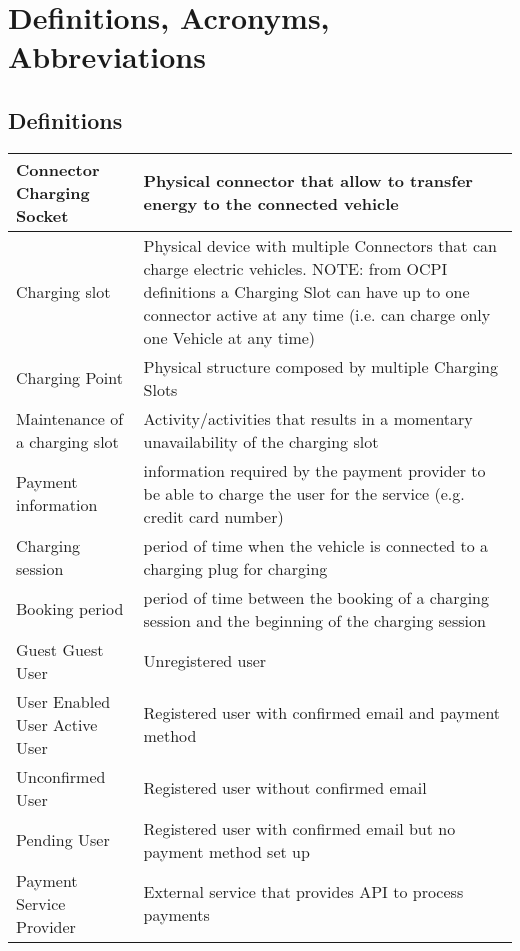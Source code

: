 \section{Definitions, Acronyms, Abbreviations}

\subsection{Definitions}

\begin{tabular}{|p{5cm}|p{10cm}|}
	\hline
	Connector \newline Charging Socket & Physical connector that allow to transfer energy to the connected vehicle\\
	\hline
	Charging slot & Physical device with multiple Connectors that can charge electric vehicles.\newline
	NOTE: from OCPI definitions a Charging Slot can have up to one connector active at any time (i.e. can charge only one Vehicle at any time) \\
	\hline
	Charging Point & Physical structure composed by multiple Charging Slots\\
	\hline
	Maintenance of a charging slot & Activity/activities that results in a momentary unavailability of the charging slot\\
	\hline
	Payment information & information required by the payment provider to be able to charge the user for the service (e.g. credit card number)\\
	\hline
	Charging session & period of time when the vehicle is connected to a charging plug for charging\\
	\hline
	Booking period & period of time between the booking of a charging session and the beginning of the charging session\\
	\hline
	{Guest \newline Guest User} & Unregistered user\\
	\hline
	{User \newline Enabled User \newline Active User} & Registered user with confirmed email and payment method\\
	\hline
	Unconfirmed User & Registered user without confirmed email\\
	\hline
	Pending User & Registered user with confirmed email but no payment method set up\\
	\hline
	Payment Service Provider & External service that provides API to process payments\\
	\hline
\end{tabular}

